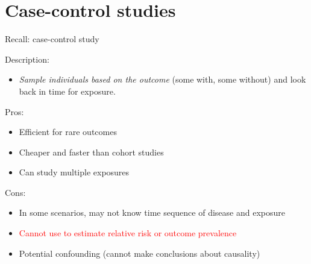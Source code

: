 \documentclass[10pt,t]{beamer}
\begin{document}
\section{Case-control studies}

\begin{frame}{Recall: case-control study}
	\vspace{-5 mm}
	
	Description:
	\begin{itemize}
		\item \textit{Sample individuals based on the outcome} (some with, some without) and look back in time for exposure. 
	\end{itemize} 
\medskip
	Pros: 
	\begin{itemize}
		\item Efficient for rare outcomes 
		\item Cheaper and faster than cohort studies 
		\item Can study multiple exposures 
	\end{itemize}
	\medskip
	Cons: 
	\begin{itemize}
		\item In some scenarios, may not know time sequence of disease and exposure 
		\item \textcolor{red}{Cannot use to estimate relative risk or outcome prevalence} 
		\item Potential confounding (cannot make conclusions about causality)
	\end{itemize}
\end{frame}
\end{document}
